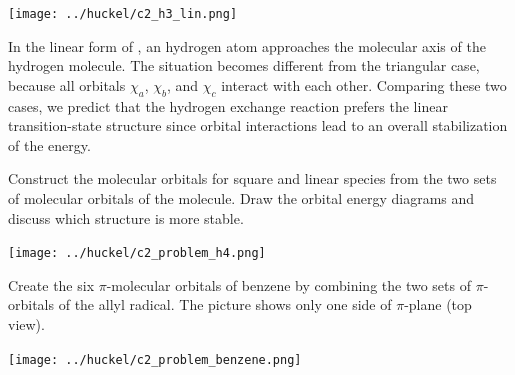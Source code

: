 \documentclass[../Main/chem532-notes.tex]{subfiles}
\begin{document}
\begin{center}
\texttt{[image: ../huckel/c2\_h3\_lin.png]}
\end{center}

In the linear form of , an hydrogen atom approaches the molecular axis of the hydrogen molecule.   The situation becomes different from the triangular  case, because all orbitals $\chi_a$, $\chi_b$, and $\chi_c$  interact with each other.
Comparing these two cases, we predict that the hydrogen exchange reaction  prefers the linear transition-state structure since orbital interactions lead to an overall stabilization of the energy.

\begin{problem}
Construct the molecular orbitals for square  and linear  species from the two sets of molecular orbitals of the  molecule. 
Draw the orbital energy diagrams and discuss which structure is more stable.

\begin{center}
\texttt{[image: ../huckel/c2\_problem\_h4.png]}
\end{center}

\end{problem}

\begin{problem}
Create the six $\pi$-molecular orbitals of benzene by combining the two sets of $\pi$-orbitals of the allyl radical.   The picture shows only one side of $\pi$-plane (top view).

\begin{center}
\texttt{[image: ../huckel/c2\_problem\_benzene.png]}
\end{center}

\end{problem}



 

 
\end{document}
